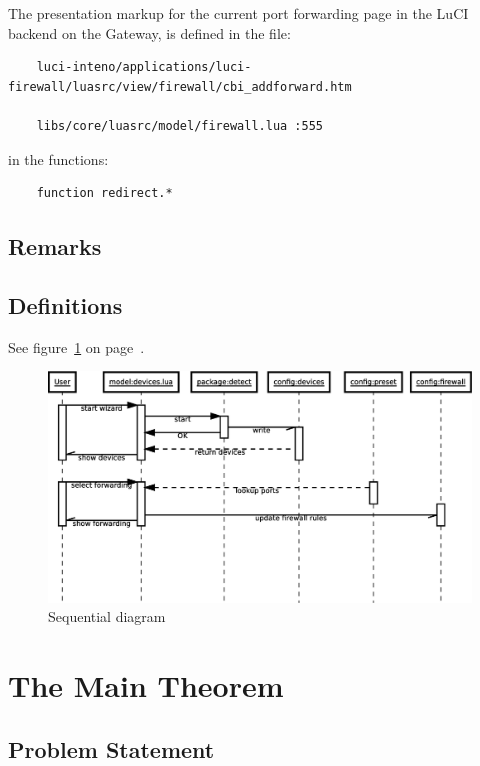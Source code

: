 \documentclass[a4paper,11pt]{kth-mag}
\begin{document}
The presentation markup for the current port forwarding page in the LuCI
backend on the Gateway, is defined in the file:

\begin{verbatim}
    luci-inteno/applications/luci-firewall/luasrc/view/firewall/cbi_addforward.htm

    libs/core/luasrc/model/firewall.lua :555
\end{verbatim}

in the functions:

\begin{verbatim}
    function redirect.*
\end{verbatim}

\subsection{Remarks}

\subsection{Definitions}
See figure~\ref{fig:wizard-seq_dia} on page~\pageref{fig:wizard-seq_dia}.
\begin{figure}[h!]
   \centering
   \includegraphics[width=15cm]{wizard-seq_dia}
   \caption{Sequential diagram}
   \label{fig:wizard-seq_dia}
\end{figure}

\section{The Main Theorem}

\subsection{Problem Statement}
\end{document}

